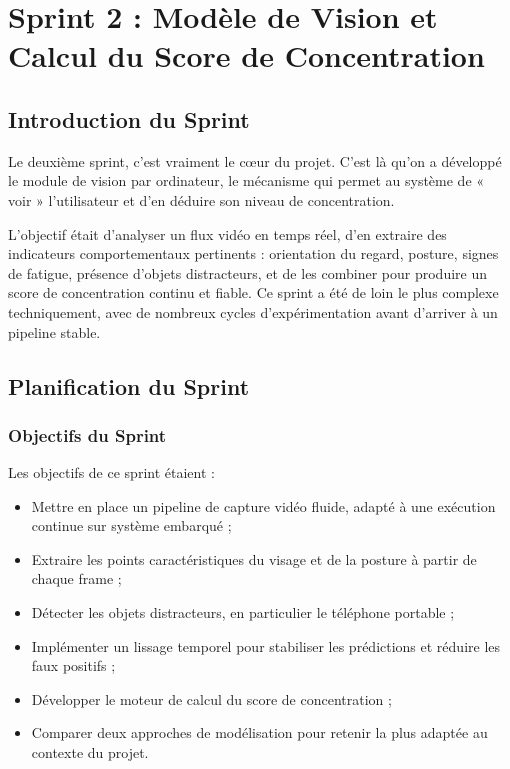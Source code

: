 \chapter{Sprint 2 : Modèle de Vision et Calcul du Score de Concentration}

\section{Introduction du Sprint}

Le deuxième sprint, c'est vraiment le cœur du projet. C'est là qu'on a développé le module de vision par ordinateur, le mécanisme qui permet au système de « voir » l'utilisateur et d'en déduire son niveau de concentration.

L'objectif était d'analyser un flux vidéo en temps réel, d'en extraire des indicateurs comportementaux pertinents : orientation du regard, posture, signes de fatigue, présence d'objets distracteurs, et de les combiner pour produire un score de concentration continu et fiable. Ce sprint a été de loin le plus complexe techniquement, avec de nombreux cycles d'expérimentation avant d'arriver à un pipeline stable.

\section{Planification du Sprint}

\subsection{Objectifs du Sprint}

Les objectifs de ce sprint étaient :

\begin{itemize}
    \item Mettre en place un pipeline de capture vidéo fluide, adapté à une exécution continue sur système embarqué ;
    \item Extraire les points caractéristiques du visage et de la posture à partir de chaque frame ;
    \item Détecter les objets distracteurs, en particulier le téléphone portable ;
    \item Implémenter un lissage temporel pour stabiliser les prédictions et réduire les faux positifs ;
    \item Développer le moteur de calcul du score de concentration ;
    \item Comparer deux approches de modélisation pour retenir la plus adaptée au contexte du projet.
\end{itemize}

